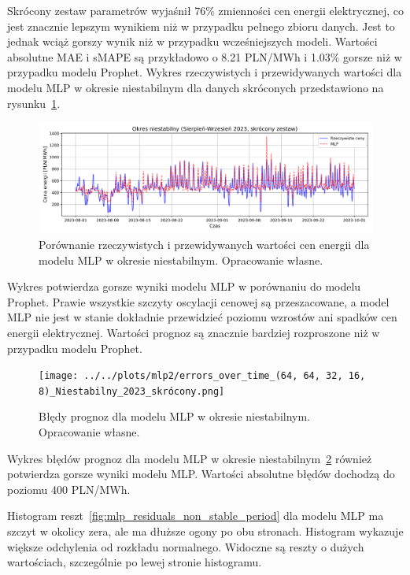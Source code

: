 Skrócony zestaw parametrów wyjaśnił 76\% zmienności cen energii elektrycznej, co jest znacznie lepszym wynikiem niż w przypadku pełnego zbioru danych. Jest to jednak wciąż gorszy wynik niż w przypadku wcześniejszych modeli. Wartości absolutne MAE i sMAPE są przykładowo o 8.21 PLN/MWh i 1.03\% gorsze niż w przypadku modelu Prophet.\newline
Wykres rzeczywistych i przewidywanych wartości dla modelu MLP w okresie niestabilnym dla danych skróconych przedstawiono na rysunku~\ref{fig:mlp_predictions_non_stable_period}.

\begin{figure}[H]
    \centering
    \includegraphics[width=1.0\textwidth]{../../plots/mlp2/mlp_predictions_short_unstable_aug_sep_(64, 64, 32, 16, 8).png}
    \caption{Porównanie rzeczywistych i przewidywanych wartości cen energii dla modelu MLP w okresie niestabilnym. Opracowanie własne.}
    \label{fig:mlp_predictions_non_stable_period}
\end{figure}

Wykres potwierdza gorsze wyniki modelu MLP w porównaniu do modelu Prophet. Prawie wszystkie szczyty oscylacji cenowej są przeszacowane, a model MLP nie jest w stanie dokładnie przewidzieć poziomu wzrostów ani spadków cen energii elektrycznej. Wartości prognoz są znacznie bardziej rozproszone niż w przypadku modelu Prophet.

\begin{figure}[H]
    \centering
    \texttt{[image: ../../plots/mlp2/errors\_over\_time\_(64, 64, 32, 16, 8)\_Niestabilny\_2023\_skrócony.png]}
    \caption{Błędy prognoz dla modelu MLP w okresie niestabilnym. Opracowanie własne.}
    \label{fig:mlp_errors_non_stable_period}
\end{figure}

Wykres błędów prognoz dla modelu MLP w okresie niestabilnym~\ref{fig:mlp_errors_non_stable_period} również potwierdza gorsze wyniki modelu MLP. Wartości absolutne błędów dochodzą do poziomu 400 PLN/MWh.

Histogram reszt~\ref{fig:mlp_residuals_non_stable_period} dla modelu MLP ma szczyt w okolicy zera, ale ma dłuższe ogony po obu stronach. Histogram wykazuje większe odchylenia od rozkładu normalnego. Widoczne są reszty o dużych wartościach, szczególnie po lewej stronie histogramu.

